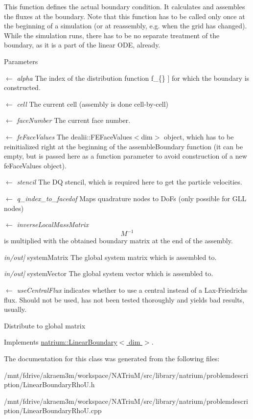 This function defines the actual boundary condition. It calculates and assembles the fluxes at the boundary. Note that this function has to be called only once at the beginning of a simulation (or at reassembly, e.g. when the grid has changed). While the simulation runs, there has to be no separate treatment of the boundary, as it is a part of the linear ODE, already. 
\begin{DoxyParams}{Parameters}
\item[\mbox{$\leftarrow$} {\em alpha}]The index of the distribution function  f\_\-\{\} \mbox{]} for which the boundary is constructed. \item[\mbox{$\leftarrow$} {\em cell}]The current cell (assembly is done cell-\/by-\/cell) \item[\mbox{$\leftarrow$} {\em faceNumber}]The current face number. \item[\mbox{$\leftarrow$} {\em feFaceValues}]The dealii::FEFaceValues$<$dim$>$ object, which has to be reinitialized right at the beginning of the assembleBoundary function (it can be empty, but is passed here as a function parameter to avoid construction of a new feFaceValues object). \item[\mbox{$\leftarrow$} {\em stencil}]The DQ stencil, which is required here to get the particle velocities. \item[\mbox{$\leftarrow$} {\em q\_\-index\_\-to\_\-facedof}]Maps quadrature nodes to DoFs (only possible for GLL nodes) \item[\mbox{$\leftarrow$} {\em inverseLocalMassMatrix}]\[ M^{-1} \] is multiplied with the obtained boundary matrix at the end of the assembly. \item[{\em in/out\mbox{]}}]systemMatrix The global system matrix which is assembled to. \item[{\em in/out\mbox{]}}]systemVector The global system vector which is assembled to. \item[\mbox{$\leftarrow$} {\em useCentralFlux}]indicates whether to use a central instead of a Lax-\/Friedrichs flux. Should not be used, has not been tested thoroughly and yields bad results, usually. \end{DoxyParams}


Distribute to global matrix 

Implements \hyperlink{classnatrium_1_1LinearBoundary_a669905b997cb9f78f8789254e28ec538}{natrium::LinearBoundary$<$ dim $>$}.

The documentation for this class was generated from the following files:\begin{DoxyCompactItemize}
\item 
/mnt/fdrive/akraem3m/workspace/NATriuM/src/library/natrium/problemdescription/LinearBoundaryRhoU.h\item 
/mnt/fdrive/akraem3m/workspace/NATriuM/src/library/natrium/problemdescription/LinearBoundaryRhoU.cpp\end{DoxyCompactItemize}
